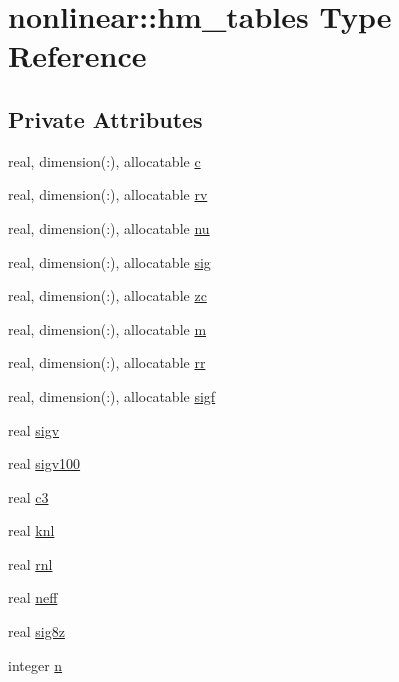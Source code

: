 \hypertarget{structnonlinear_1_1hm__tables}{}\section{nonlinear\+:\+:hm\+\_\+tables Type Reference}
\label{structnonlinear_1_1hm__tables}
\subsection*{Private Attributes}
\begin{DoxyCompactItemize}
\item 
real, dimension(\+:), allocatable \mbox{\hyperlink{structnonlinear_1_1hm__tables_af1aab17bdd731270786b11310f023ce5}{c}}
\item 
real, dimension(\+:), allocatable \mbox{\hyperlink{structnonlinear_1_1hm__tables_a28a26102acdf8431f73d112042171aef}{rv}}
\item 
real, dimension(\+:), allocatable \mbox{\hyperlink{structnonlinear_1_1hm__tables_ad81962bc57846e090e5af95d1c5715d7}{nu}}
\item 
real, dimension(\+:), allocatable \mbox{\hyperlink{structnonlinear_1_1hm__tables_a8c8cffb2567eca7b6ece629edbcfc220}{sig}}
\item 
real, dimension(\+:), allocatable \mbox{\hyperlink{structnonlinear_1_1hm__tables_aedbb7da467cd2bf16769ee32c8b7fa1f}{zc}}
\item 
real, dimension(\+:), allocatable \mbox{\hyperlink{structnonlinear_1_1hm__tables_a277c4f7874678840450c9a73c499b579}{m}}
\item 
real, dimension(\+:), allocatable \mbox{\hyperlink{structnonlinear_1_1hm__tables_a28ea3313cd08874fbb4e8f9045ad7329}{rr}}
\item 
real, dimension(\+:), allocatable \mbox{\hyperlink{structnonlinear_1_1hm__tables_ad5106f1061ee82d5a2d23cd62be64a60}{sigf}}
\item 
real \mbox{\hyperlink{structnonlinear_1_1hm__tables_ab82dc3361e3ab40fe708483d54c9d987}{sigv}}
\item 
real \mbox{\hyperlink{structnonlinear_1_1hm__tables_a9a06227d2e8f00e1a66fd51740f84906}{sigv100}}
\item 
real \mbox{\hyperlink{structnonlinear_1_1hm__tables_aa853fbd1a5106e9f74b336d74910a977}{c3}}
\item 
real \mbox{\hyperlink{structnonlinear_1_1hm__tables_a209758090a73fc561719d8101ac383bc}{knl}}
\item 
real \mbox{\hyperlink{structnonlinear_1_1hm__tables_afdd7745d44869eaf5feea5b585542233}{rnl}}
\item 
real \mbox{\hyperlink{structnonlinear_1_1hm__tables_afb7cbcc466d7bd8a59a51843c25d533f}{neff}}
\item 
real \mbox{\hyperlink{structnonlinear_1_1hm__tables_a1313cfe358d50fd841d672386556d9cf}{sig8z}}
\item 
integer \mbox{\hyperlink{structnonlinear_1_1hm__tables_a9a554d173093fe15ad053c88975806b7}{n}}
\end{DoxyCompactItemize}


